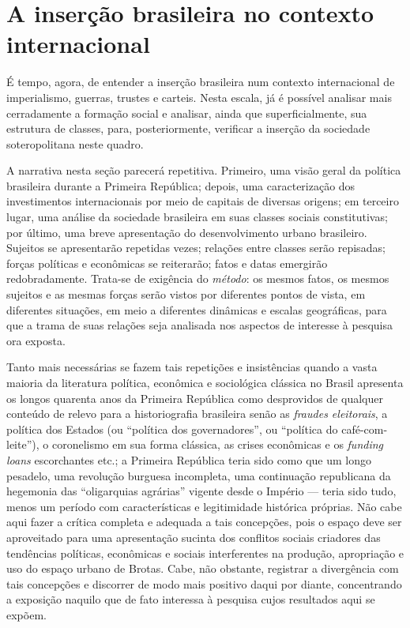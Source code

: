 \section{A inserção brasileira no contexto internacional}\label{sec:insbrascontint}

É tempo, agora, de entender a inserção brasileira num contexto internacional de imperialismo, guerras, trustes e carteis. Nesta escala, já é possível analisar mais cerradamente a formação social e analisar, ainda que superficialmente, sua estrutura de classes, para, posteriormente, verificar a inserção da sociedade soteropolitana neste quadro.

A narrativa nesta seção parecerá repetitiva. Primeiro, uma visão geral da política brasileira durante a Primeira República; depois, uma caracterização dos investimentos internacionais por meio de capitais de diversas origens; em terceiro lugar, uma análise da sociedade brasileira em suas classes sociais constitutivas; por último, uma breve apresentação do desenvolvimento urbano brasileiro. Sujeitos se apresentarão repetidas vezes; relações entre classes serão repisadas; forças políticas e econômicas se reiterarão; fatos e datas emergirão redobradamente. Trata-se de exigência do \textit{método}: os mesmos fatos, os mesmos sujeitos e as mesmas forças serão vistos por diferentes pontos de vista, em diferentes situações, em meio a diferentes dinâmicas e escalas geográficas, para que a trama de suas relações seja analisada nos aspectos de interesse à pesquisa ora exposta. 

Tanto mais necessárias se fazem tais repetições e insistências quando a vasta maioria da literatura política, econômica e sociológica clássica no Brasil apresenta os longos quarenta anos da Primeira República como desprovidos de qualquer conteúdo de relevo para a historiografia brasileira senão as \textit{fraudes eleitorais}, a política dos Estados (ou ``política dos governadores'', ou ``política do café-com-leite''), o coronelismo em sua forma clássica, as crises econômicas e os \textit{funding loans} escorchantes etc.; a Primeira República teria sido como que um longo pesadelo, uma revolução burguesa incompleta, uma continuação republicana da hegemonia das ``oligarquias agrárias'' vigente desde o Império --- teria sido tudo, menos um período com características e legitimidade histórica próprias. Não cabe aqui fazer a crítica completa e adequada a tais concepções, pois o espaço deve ser aproveitado para uma apresentação sucinta dos conflitos sociais criadores das tendências políticas, econômicas e sociais interferentes na produção, apropriação e uso do espaço urbano de Brotas. Cabe, não obstante, registrar a divergência com tais concepções e discorrer de modo mais positivo daqui por diante, concentrando a exposição naquilo que de fato interessa à pesquisa cujos resultados aqui se expõem.

